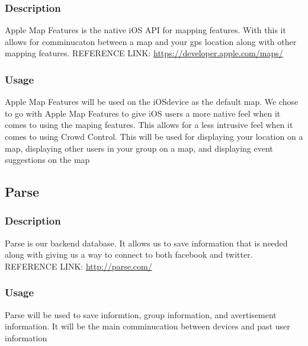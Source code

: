 	\subsubsection{Description}
	Apple Map Features is the native iOS API for mapping features. With this it allows for comminucaton between a map and your gps location along with other mapping features.
\newline
REFERENCE LINK: \url{https://developer.apple.com/maps/}
	\subsubsection{Usage}
Apple Map Features will be used on the iOSdevice as the default map. We chose to go with Apple Map Features to give iOS users a more native feel when it comes to using the maping features. This allows for a less intrusive feel when it comes to using Crowd Control. This will be used for displaying your location on a map, displaying other users in your group on a map, and displaying event suggestions on the map

\subsection{Parse}
	\subsubsection{Description}
	Parse is our backend database. It allows us to save information that is needed along with giving us a way to connect to both facebook and twitter.
\newline
REFERENCE LINK: \url{http://parse.com/}
	\subsubsection{Usage}
	Parse will be used to save informtion, group information, and avertisement information. It will be the main comminucation between devices and past user information



